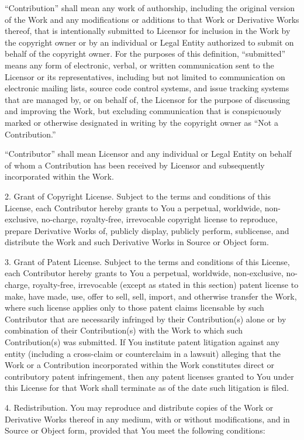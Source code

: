 \documentclass[letterpaper,10pt,english]{sphinxmanual}
\begin{document}
“Contribution” shall mean any work of authorship, including
the original version of the Work and any modifications or additions
to that Work or Derivative Works thereof, that is intentionally
submitted to Licensor for inclusion in the Work by the copyright owner
or by an individual or Legal Entity authorized to submit on behalf of
the copyright owner. For the purposes of this definition, “submitted”
means any form of electronic, verbal, or written communication sent
to the Licensor or its representatives, including but not limited to
communication on electronic mailing lists, source code control systems,
and issue tracking systems that are managed by, or on behalf of, the
Licensor for the purpose of discussing and improving the Work, but
excluding communication that is conspicuously marked or otherwise
designated in writing by the copyright owner as “Not a Contribution.”

“Contributor” shall mean Licensor and any individual or Legal Entity
on behalf of whom a Contribution has been received by Licensor and
subsequently incorporated within the Work.

2. Grant of Copyright License. Subject to the terms and conditions of
this License, each Contributor hereby grants to You a perpetual,
worldwide, non-exclusive, no-charge, royalty-free, irrevocable
copyright license to reproduce, prepare Derivative Works of,
publicly display, publicly perform, sublicense, and distribute the
Work and such Derivative Works in Source or Object form.

3. Grant of Patent License. Subject to the terms and conditions of
this License, each Contributor hereby grants to You a perpetual,
worldwide, non-exclusive, no-charge, royalty-free, irrevocable
(except as stated in this section) patent license to make, have made,
use, offer to sell, sell, import, and otherwise transfer the Work,
where such license applies only to those patent claims licensable
by such Contributor that are necessarily infringed by their
Contribution(s) alone or by combination of their Contribution(s)
with the Work to which such Contribution(s) was submitted. If You
institute patent litigation against any entity (including a
cross-claim or counterclaim in a lawsuit) alleging that the Work
or a Contribution incorporated within the Work constitutes direct
or contributory patent infringement, then any patent licenses
granted to You under this License for that Work shall terminate
as of the date such litigation is filed.

4. Redistribution. You may reproduce and distribute copies of the
Work or Derivative Works thereof in any medium, with or without
modifications, and in Source or Object form, provided that You
meet the following conditions:
\end{document}
